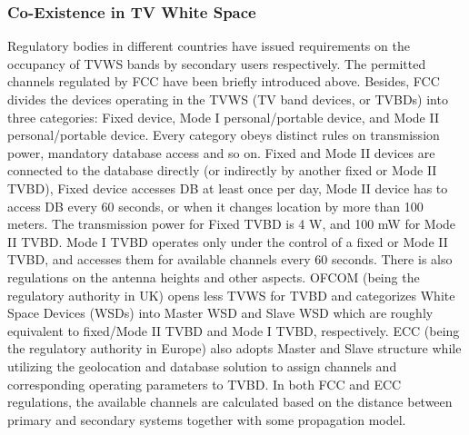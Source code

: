 \subsubsection*{Co-Existence in TV White Space}

Regulatory bodies in different countries have issued requirements on the occupancy of TVWS bands by secondary users respectively. 
The permitted channels regulated by FCC have been briefly introduced above.
Besides, FCC divides the devices operating in the TVWS (TV band devices, or \glspl{TVBD}) into three categories: Fixed device, Mode I personal/portable device, and Mode II personal/portable device. Every category obeys distinct rules on transmission power, mandatory database access and so on.
Fixed and Mode II devices are connected to the database directly (or indirectly by another fixed or Mode II TVBD), Fixed device accesses DB at least once per day, Mode II device has to access DB every 60 seconds, or when it changes location by more than 100 meters.
The transmission power for Fixed TVBD is 4 W, and 100 mW for Mode II TVBD. 
Mode I TVBD operates only under the control of a fixed or Mode II TVBD, and accesses them for available channels every 60 seconds.
There is also regulations on the antenna heights and other aspects.
OFCOM (being the regulatory authority in UK) opens less TVWS for TVBD and categorizes White Space Devices (WSDs) into Master WSD and Slave WSD which are roughly equivalent to fixed/Mode II TVBD and Mode I TVBD, respectively.
ECC (being the regulatory authority in Europe) also adopts Master and Slave structure while utilizing the geolocation and database solution to assign channels and corresponding operating parameters to TVBD.
In both FCC and ECC regulations, the available channels are calculated based on the distance between primary and secondary systems together with some propagation model.
